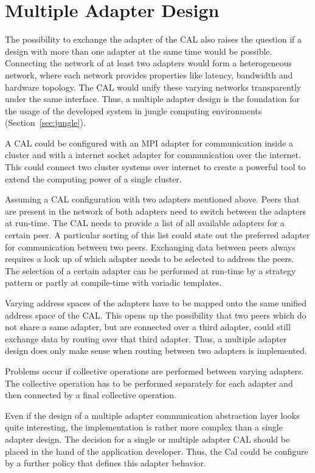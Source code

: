 \section*{Multiple Adapter Design}
The possibility to exchange the adapter of the CAL also raises
the question if a design with more than one adapter at the same time
would be possible. Connecting the network of at least two adapters
would form a heterogeneous network, where each network provides 
properties like latency, bandwidth and hardware topology. The CAL
would unify these varying networks transparently under the same
interface. Thus, a multiple adapter design is the foundation for the
usage of the developed system in jungle computing environments (Section~\ref{sec:jungle}).

A CAL could be configured with an MPI adapter for communication inside
a cluster and with a internet socket adapter for communication over
the internet. This could connect two cluster systems over internet
to create a powerful tool to extend the computing power of a single
cluster.

Assuming a CAL configuration with two adapters mentioned above. Peers
that are present in the network of both adapters need to switch
between the adapters at run-time.  The CAL needs to provide a list of
all available adapters for a certain peer.  A particular sorting of
this list could state out the preferred adapter for communication
between two peers. Exchanging data between peers always requires a
look up of which adapter needs to be selected to address the
peers. The selection of a certain adapter can be performed at run-time
by a strategy pattern or partly at compile-time with variadic
templates.

Varying address spaces of the adapters have to be mapped onto the same
unified address space of the CAL.  This opens up the possibility that
two peers which do not share a same adapter, but are connected over a
third adapter, could still exchange data by routing over that third
adapter. Thus, a multiple adapter design does only make sense when
routing between two adapters is implemented.

Problems occur if collective operations are performed between varying
adapters. The collective operation has to be performed separately for
each adapter and then connected by a final collective operation.

Even if the design of a multiple adapter communication abstraction
layer looks quite interesting, the implementation is rather more
complex than a single adapter design. The decision for a single or
multiple adapter CAL should be placed in the hand of the application
developer.  Thus, the Cal could be configure by a further policy that
defines this adapter behavior.


